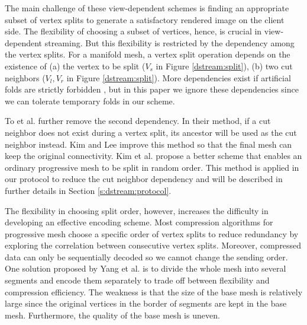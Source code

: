     The main challenge of these view-dependent schemes is 
    finding an appropriate subset of vertex splits to generate a 
    satisfactory rendered image on the client side.
    The flexibility of choosing a subset of vertices,
    hence, is crucial in view-dependent streaming. But this flexibility is
    restricted by the dependency among the vertex splits.
    For a manifold mesh, a vertex split operation depends on the existence of (a)
    the vertex to be split ($V_s$ in Figure \ref{dstream:split}), (b) two
    cut neighbors ($V_l, V_r$ in Figure \ref{dstream:split}). More dependencies exist if artificial
    folds are strictly forbidden \cite{258843, 258847}, but in this paper we
    ignore these dependencies since we can tolerate temporary folds in our scheme.

     To et al. \cite{To1999} further remove the second dependency.
     In their method, if a cut neighbor does not exist during a vertex split,
     its ancestor will be used as the cut neighbor instead.
     Kim and Lee \cite{kim01truly} improve this method so that the final mesh
     can keep the original connectivity. 
     Kim et al. \cite{multiresolution:kim} propose a better scheme that enables
     an ordinary progressive mesh to be split in random order.
     This method is applied in our protocol to reduce the cut neighbor dependency
     and will be described in further details in Section \ref{s:dstream:protocol}.

     The flexibility in choosing split order, however, increases the difficulty
     in developing an effective encoding scheme. Most compression
     algorithms for progressive mesh %
     choose a specific order of vertex splits
     to reduce redundancy by exploring the correlation
     between consecutive vertex splits.
     Moreover, compressed data can only be sequentially decoded
     so we cannot change the sending order. One solution
     proposed by Yang et al. \cite{progressive:Yang}
     is to divide the whole mesh into several segments and encode them
     separately to trade off between flexibility and compression efficiency.
     The weakness is that the size of the base mesh is relatively large
     since the original vertices in the border of segments are kept in the base
     mesh. Furthermore, the quality of the base mesh is uneven.

